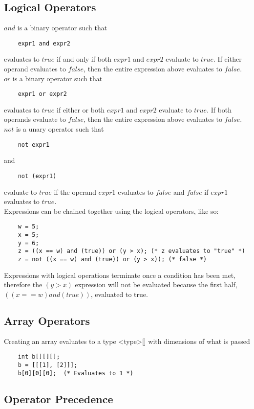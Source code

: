\begin{homeworkProblem}
	\subsection{Logical Operators}
	$and$ is a binary operator such that
	\begin{verbatim}
	expr1 and expr2
	\end{verbatim}
	evaluates to $true$ if and only if both $expr1$ and $expr2$ evaluate to $true$. If either operand evaluates to $false$, then the entire expression above evaluates to $false$.\\
	$or$ is a binary operator such that
	\begin{verbatim}
	expr1 or expr2
	\end{verbatim}
	evaluates to $true$ if either or both $expr1$ and $expr2$ evaluate to $true$. If both operands evaluate to $false$, then the entire expression above evaluates to $false$.\\
	$not$ is a unary operator such that
	\begin{verbatim}
	not expr1
	\end{verbatim}
	and
	\begin{verbatim}
	not (expr1)
	\end{verbatim}
	evaluate to $true$ if the operand $expr1$ evaluates to $false$ and $false$ if $expr1$ evaluates to $true$.\\
	Expressions can be chained together using the logical operators, like so:
	\begin{verbatim}
	w = 5;
	x = 5;
	y = 6;
	z = ((x == w) and (true)) or (y > x); (* z evaluates to "true" *)
	z = not ((x == w) and (true)) or (y > x)); (* false *)
	\end{verbatim}
	
	Expressions with logical operations terminate once a condition has been met, therefore the $(y>x)$ expression will not be evaluated because the first half, $((x == w) and (true))$, evaluated to true.
	
	\subsection{Array Operators}
	Creating an array evaluates to a type \textless type\textgreater[] with dimensions of what is passed
	\begin{verbatim}
	int b[][][];
	b = [[[1], [2]]];
	b[0][0][0];  (* Evaluates to 1 *)
	\end{verbatim}
	
	\subsection{Operator Precedence}
	

\end{homeworkProblem}
